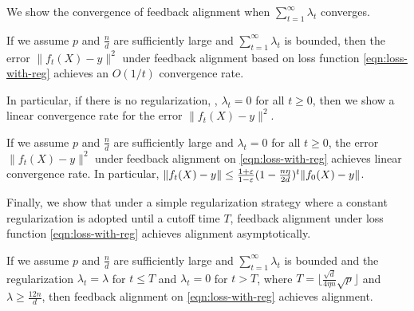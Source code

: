 We show the convergence of feedback alignment when $\sum_{t=1}^\infty \lambda_t$ converges. 
\begin{theorem}[informal]
    If we assume $p$ and $\frac{n}{d}$ are sufficiently large and $\sum_{t=1}^\infty \lambda_t$ is bounded, then the error $\|f_t(X) - y\|^2$ under feedback alignment based on loss function \eqref{eqn:loss-with-reg} achieves an $O(1/t)$ convergence rate.
\end{theorem}
In particular, if there is no regularization, \ie, $\lambda_t=0$ for all $t\geq 0$, then we show a linear convergence rate for the error $\|f_t(X) - y\|^2$.
\begin{corollary}[informal]
    If we assume $p$ and $\frac{n}{d}$ are sufficiently large and $\lambda_t = 0$ for all $t\geq 0$, the error $\|f_t(X) - y\|^2$ under feedback alignment on \eqref{eqn:loss-with-reg} achieves linear convergence rate. In particular, $\|f_t(X) - y\| \leq \frac{1+\varepsilon}{1-\varepsilon}(1-\frac{n\eta}{2d})^t \|f_0(X) - y\|$.
\end{corollary}
Finally, we show that under a simple regularization strategy where a constant regularization is adopted until a cutoff time $T$, feedback alignment under loss function \eqref{eqn:loss-with-reg} achieves alignment asymptotically.
\begin{theorem}[informal]
    If we assume $p$ and $\frac{n}{d}$ are sufficiently large and $\sum_{t=1}^\infty \lambda_t$ is bounded and the regularization $\lambda_t = \lambda$ for $t\leq T$ and $\lambda_t = 0$ for $t>T$, where $T = \lfloor \frac{\sqrt{d}}{4\eta n}\sqrt{p} \rfloor$ and $\lambda \geq \frac{12n}{d}$,
    then feedback alignment on \eqref{eqn:loss-with-reg} achieves alignment.
\end{theorem}


